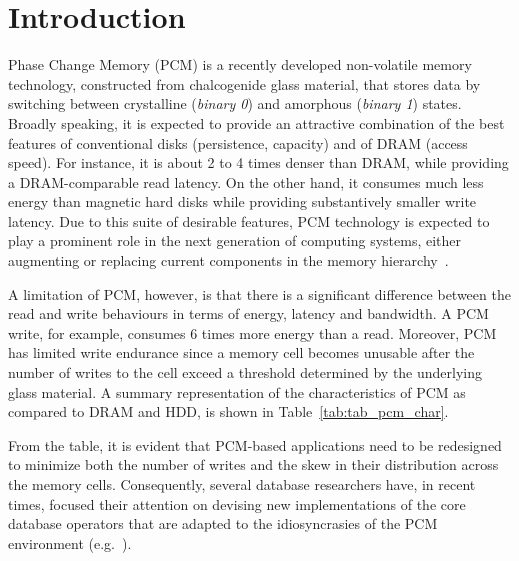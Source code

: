 \section{Introduction}
\label{sec:intro}
%
Phase Change Memory (PCM) is a recently developed non-volatile memory
technology, constructed from chalcogenide glass material, that stores
data by switching between crystalline (\emph{binary 0}) and amorphous 
(\emph{binary 1}) states. Broadly speaking, it is expected to provide an attractive
combination of the best features of conventional disks (persistence,
capacity) and of DRAM (access speed). For instance, it is
about 2 to 4 times denser than DRAM, while providing a DRAM-comparable
read latency.  On the other hand, it consumes much less energy
than magnetic hard disks while providing substantively smaller write latency. Due to this suite of  desirable features, PCM technology is
expected to play a prominent role in the next generation of computing
systems, either augmenting or replacing current components in the memory
hierarchy~\cite{qureshi,zhou,lee}.

A limitation of PCM, however, is that there is a significant difference
between the read and write behaviours in terms of energy, latency and
bandwidth. A PCM write, for example, consumes 6 times more energy than
a read. Moreover, PCM has limited write endurance since a memory cell
becomes unusable after the number of writes to the cell exceed a threshold
determined by the underlying glass material. A summary representation
of the characteristics of PCM as compared to DRAM and HDD, is shown in
Table~\ref{tab:tab_pcm_char}.

From the table, it is evident that PCM-based applications need to be
redesigned to minimize both the number of writes and the skew in their
distribution across the memory cells.  Consequently, several database
researchers have, in recent times, focused their attention on devising
new implementations of the core database operators that are adapted to
the idiosyncrasies of the PCM environment (e.g.~\cite{chen,viglas}).

